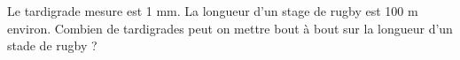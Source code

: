 
Le tardigrade mesure est 1 mm. La longueur d'un stage de rugby est 100 m environ. Combien de tardigrades peut on mettre bout à bout sur la longueur d'un stade de rugby ?